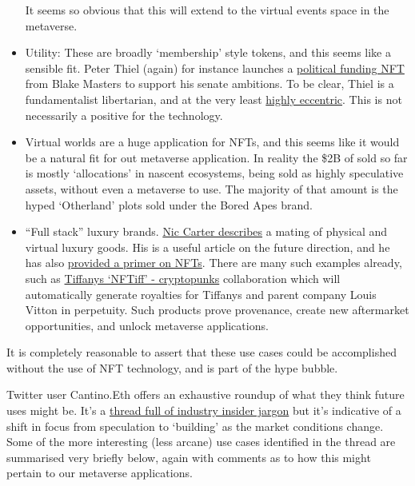 \begin{itemize}
It seems so obvious that this will extend to the virtual events space in the metaverse.
\item Utility: These are broadly `membership' style tokens, and this seems like a sensible fit. Peter Thiel (again) for instance launches a \href{https://www.ztonft.com/}{political funding NFT} from Blake Masters to support his senate ambitions. To be clear, Thiel is a fundamentalist libertarian, and at the very least \href{https://gizmodo.com/peter-thiel-bitcoin-talk-miami-2022-1848764790}{highly eccentric}. This is not necessarily a positive for the technology.
\item Virtual worlds are a huge application for NFTs, and this seems like it would be a natural fit for out metaverse application. In reality the \$2B of sold so far is mostly `allocations' in nascent ecosystems, being sold as highly speculative assets, without even a metaverse to use. The majority of that amount is the hyped `Otherland' plots sold under the Bored Apes brand.
\item ``Full stack'' luxury brands. \href{https://medium.com/@nic__carter/redeem-and-retain-nfts-are-the-future-of-luxury-goods-760f00dbce23}{Nic Carter describes} a mating of physical and virtual luxury goods. His is a useful article on the future direction, and he has also \href{https://medium.com/@nic__carter/why-nfts-are-hard-to-explain-48f0ab0a35bf}{provided a primer on NFTs}. There are many such examples already, such as \href{https://nft.tiffany.com/faq/}{Tiffanys `NFTiff' - cryptopunks} collaboration which will automatically generate royalties for Tiffanys and parent company Louis Vitton in perpetuity. Such products prove provenance, create new aftermarket opportunities, and unlock metaverse applications.
\end{itemize}
It is completely reasonable to assert that these use cases could be accomplished without the use of NFT technology, and is part of the hype bubble.\par
Twitter user Cantino.Eth offers an exhaustive roundup of what they think future uses might be. It's a \href{https://twitter.com/chriscantino/status/1542930648750608387}{thread full of industry insider jargon} but it's indicative of a shift in focus from speculation to `building' as the market conditions change. Some of the more interesting (less arcane) use cases identified in the thread are summarised very briefly below, again with comments as to how this might pertain to our metaverse applications.
